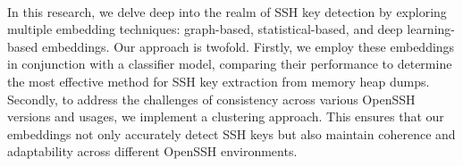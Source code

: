 \paragraph{}In this research, we delve deep into the realm of SSH key detection by exploring multiple embedding techniques: graph-based, statistical-based, and deep learning-based embeddings. Our approach is twofold. Firstly, we employ these embeddings in conjunction with a classifier model, comparing their performance to determine the most effective method for SSH key extraction from memory heap dumps. Secondly, to address the challenges of consistency across various OpenSSH versions and usages, we implement a clustering approach. This ensures that our embeddings not only accurately detect SSH keys but also maintain coherence and adaptability across different OpenSSH environments.
